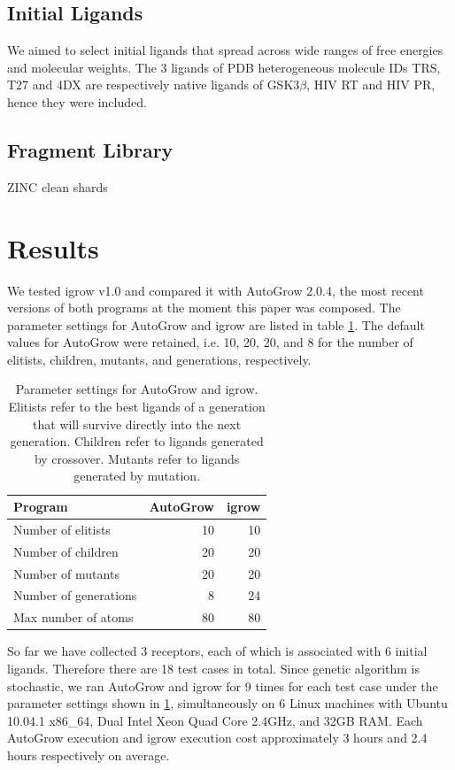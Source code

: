 \documentclass[10pt, conference, compsocconf]{IEEEtran}
\begin{document}
\subsection{Initial Ligands}

We aimed to select initial ligands that spread across wide ranges of free energies and molecular weights. The 3 ligands of PDB heterogeneous molecule IDs TRS, T27 and 4DX are respectively native ligands of GSK3$\beta$, HIV RT and HIV PR, hence they were included.

\subsection{Fragment Library}

ZINC clean shards

\section{Results}

We tested igrow v1.0 and compared it with AutoGrow 2.0.4, the most recent versions of both programs at the moment this paper was composed. The parameter settings for AutoGrow and igrow are listed in table \ref{tab:ParameterSettings}. The default values for AutoGrow were retained, i.e. 10, 20, 20, and 8 for the number of elitists, children, mutants, and generations, respectively.

\begin{table}
\centering
\begin{tabular*}
{\linewidth}
{@{\extracolsep{\fill}}lrr}
\noalign{\smallskip}\toprule
Program & AutoGrow & igrow\\
\midrule
\noalign{\smallskip}
Number of elitists & 10 & 10\\
Number of children & 20 & 20\\
Number of mutants & 20 & 20\\
Number of generations & 8 & 24\\
Max number of atoms & 80 & 80\\
\bottomrule
\end{tabular*}
\caption{Parameter settings for AutoGrow and igrow. Elitists refer to the best ligands of a generation that will survive directly into the next generation. Children refer to ligands generated by crossover. Mutants refer to ligands generated by mutation.}
\label{tab:ParameterSettings}
\end{table}

So far we have collected 3 receptors, each of which is associated with 6 initial ligands. Therefore there are 18 test cases in total. Since genetic algorithm is stochastic, we ran AutoGrow and igrow for 9 times for each test case under the parameter settings shown in \ref{tab:ParameterSettings}, simultaneously on 6 Linux machines with Ubuntu 10.04.1 x86\_64, Dual Intel Xeon Quad Core 2.4GHz, and 32GB RAM. Each AutoGrow execution and igrow execution cost approximately 3 hours and 2.4 hours respectively on average.
\end{document}
